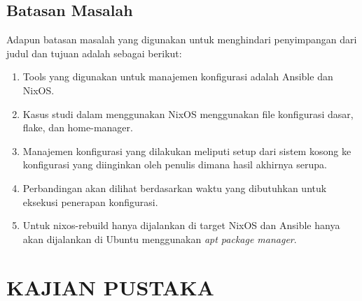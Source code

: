 \documentclass[10pt,twoside]{report}
\begin{document}
\section{Batasan Masalah}

\begin{adjustwidth}{0.70cm}{}
	Adapun batasan masalah yang digunakan untuk menghindari penyimpangan dari judul dan tujuan adalah sebagai berikut:
	\begin{enumerate}[leftmargin=0.45cm, nolistsep]
		\item Tools yang digunakan untuk manajemen konfigurasi adalah Ansible dan
		      NixOS.
		\item Kasus studi dalam menggunakan NixOS menggunakan file konfigurasi
		      dasar, flake, dan home-manager.
		\item Manajemen konfigurasi yang dilakukan meliputi setup dari sistem
		      kosong ke konfigurasi yang diinginkan oleh penulis dimana hasil akhirnya
		      serupa.
		\item Perbandingan akan dilihat berdasarkan waktu yang dibutuhkan untuk
		      eksekusi penerapan konfigurasi.
		\item Untuk nixos-rebuild hanya dijalankan di target NixOS dan Ansible hanya
		      akan dijalankan di Ubuntu menggunakan \textit{apt package manager}.
	\end{enumerate}
\end{adjustwidth}
\chapter{KAJIAN PUSTAKA}
\end{document}
